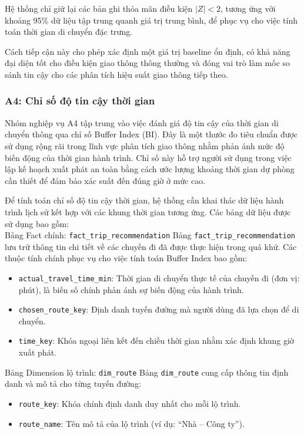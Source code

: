 Hệ thống chỉ giữ lại các bản ghi thỏa mãn điều kiện $|Z| < 2$, tương ứng với khoảng 95\% dữ liệu tập trung quanh giá trị trung bình, để phục vụ cho việc tính toán thời gian di chuyển đặc trưng.

Cách tiếp cận này cho phép xác định một giá trị baseline ổn định, có khả năng đại diện tốt cho điều kiện giao thông thông thường và đóng vai trò làm mốc so sánh tin cậy cho các phân tích hiệu suất giao thông tiếp theo.

\subsubsection{A4: Chỉ số độ tin cậy thời gian}

Nhóm nghiệp vụ A4 tập trung vào việc đánh giá độ tin cậy của thời gian di chuyển thông qua chỉ số Buffer Index (BI). Đây là một thước đo tiêu chuẩn được sử dụng rộng rãi trong lĩnh vực phân tích giao thông nhằm phản ánh mức độ biến động của thời gian hành trình. Chỉ số này hỗ trợ người sử dụng trong việc lập kế hoạch xuất phát an toàn bằng cách ước lượng khoảng thời gian dự phòng cần thiết để đảm bảo xác suất đến đúng giờ ở mức cao.


Để tính toán chỉ số độ tin cậy thời gian, hệ thống cần khai thác dữ liệu hành trình lịch sử kết hợp với các khung thời gian tương ứng. Các bảng dữ liệu được sử dụng bao gồm:\\

Bảng Fact chính: \texttt{fact\_trip\_recommendation}
Bảng \texttt{fact\_trip\_recommendation} lưu trữ thông tin chi tiết về các chuyến đi đã được thực hiện trong quá khứ. Các thuộc tính chính phục vụ cho việc tính toán Buffer Index bao gồm:
\begin{itemize}
    \item \texttt{actual\_travel\_time\_min}: Thời gian di chuyển thực tế của chuyến đi (đơn vị: phút), là biến số chính phản ánh sự biến động của hành trình.
    \item \texttt{chosen\_route\_key}: Định danh tuyến đường mà người dùng đã lựa chọn để di chuyển.
    \item \texttt{time\_key}: Khóa ngoại liên kết đến chiều thời gian nhằm xác định khung giờ xuất phát.
\end{itemize}

Bảng Dimension lộ trình: \texttt{dim\_route}
Bảng \texttt{dim\_route} cung cấp thông tin định danh và mô tả cho từng tuyến đường:
\begin{itemize}
    \item \texttt{route\_key}: Khóa chính định danh duy nhất cho mỗi lộ trình.
    \item \texttt{route\_name}: Tên mô tả của lộ trình (ví dụ: ``Nhà -- Công ty'').
\end{itemize}

